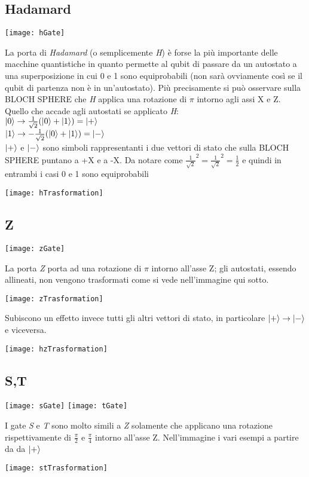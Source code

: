 \subsection{Hadamard}
\begin{center}
\texttt{[image: hGate]}
\end{center}
La porta di \textit{Hadamard} (o semplicemente \textit{H}) è forse la più importante delle macchine quantistiche in quanto permette al qubit di passare da un autostato a una superposizione in cui 0 e 1 sono equiprobabili (non sarà ovviamente così se il qubit di partenza non è in un'autostato). Più precisamente si può osservare sulla BLOCH SPHERE che \textit{H} applica una rotazione di $\pi$ intorno agli assi X e Z.\\
Quello che accade agli autostati se applicato \textit{H}:\\
$\ket{0} \rightarrow \frac{1}{\sqrt{2}}(\ket{0} + \ket{1}) = \ket{+}$\\
$\ket{1} \rightarrow -\frac{1}{\sqrt{2}}(\ket{0} + \ket{1}) = \ket{-}$\\
$\ket{+}$ e $\ket{-}$ sono simboli rappresentanti i due vettori di stato che sulla BLOCH SPHERE puntano a +X e a -X. Da notare come $\frac{1}{\sqrt{2}}^2 = \frac{1}{\sqrt{2}}^2 = \frac{1}{2}$ e quindi in entrambi i casi 0 e 1 sono equiprobabili
\begin{center}
\texttt{[image: hTrasformation]}
\end{center}
\subsection{Z}
\begin{center}
\texttt{[image: zGate]}
\end{center}
La porta \textit{Z} porta ad una rotazione di $\pi$ intorno all'asse Z; gli autostati, essendo allineati, non vengono trasformati come si vede nell'immagine qui sotto.
\begin{center}
\texttt{[image: zTrasformation]}
\end{center}
Subiscono un effetto invece tutti gli altri vettori di stato, in particolare $\ket{+} \rightarrow \ket{-}$ e viceversa.
\begin{center}
\texttt{[image: hzTrasformation]}
\end{center}
\subsection{S,T}
\begin{center}
\texttt{[image: sGate]}
\texttt{[image: tGate]}
\end{center}
I gate \textit{S} e \textit{T} sono molto simili a \textit{Z} solamente che applicano una rotazione rispettivamente di $\frac{\pi}{2}$ e $\frac{\pi}{4}$ intorno all'asse Z. Nell'immagine i vari esempi a partire da da $\ket{+}$
\begin{center}
\texttt{[image: stTrasformation]}
\end{center}

